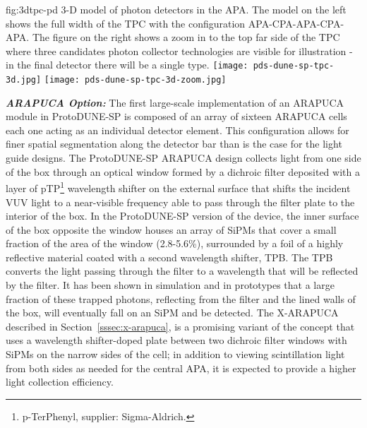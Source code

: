 \begin{dunefigure}{fig:3dtpc-pd}
{3-D model of photon detectors in the APA. The model on the left shows the full width of the TPC with the configuration APA-CPA-APA-CPA-APA. The figure on the right shows a zoom in to the top far side of the TPC where three candidates photon collector technologies are visible for illustration - in the final detector there will be a single type.}
\texttt{[image: pds-dune-sp-tpc-3d.jpg]}
\texttt{[image: pds-dune-sp-tpc-3d-zoom.jpg]}
\end{dunefigure}


{\it\bf ARAPUCA Option:} The first large-scale implementation of an ARAPUCA module in ProtoDUNE-SP is composed of an array of sixteen ARAPUCA cells each one acting as an individual detector element. This configuration allows for finer spatial segmentation along the detector bar than is the case for the light guide designs. 
The ProtoDUNE-SP ARAPUCA design collects light from one side of the box through an optical window formed  
by a dichroic filter deposited with a layer of pTP\footnote{p-TerPhenyl,  supplier: Sigma-Aldrich\textregistered.}
wavelength shifter on the external surface that shifts the incident VUV light to a near-visible frequency able to pass through the filter plate to the interior of the box.  
In the ProtoDUNE-SP version of the device, the inner surface of the box opposite the window houses an array of SiPMs that cover a small fraction of the area of the window (2.8-5.6\%), surrounded by a foil of a highly reflective material coated with a second wavelength shifter, TPB. The TPB
converts the light passing through the filter to a wavelength that will be reflected by the filter. It has been shown in simulation and in prototypes that a large fraction of these trapped photons, reflecting from the filter and the lined walls of the box, will eventually fall on an SiPM and be detected.
The X-ARAPUCA described in Section~\ref{sssec:x-arapuca}, is a promising variant of the concept that uses a wavelength shifter-doped plate between two dichroic filter windows with SiPMs on the narrow sides of the cell; in addition to viewing scintillation light from both sides as needed for the central APA, it is expected to provide a higher light collection efficiency.


